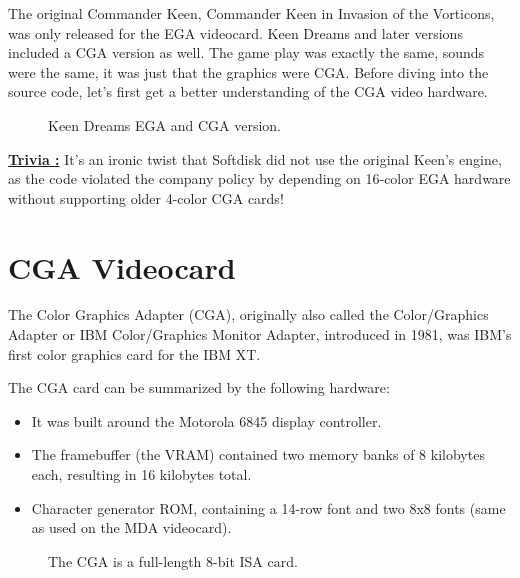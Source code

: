\documentclass[book.tex]{subfiles}
\begin{document}
The original Commander Keen, Commander Keen in Invasion of the Vorticons, was only released for the EGA videocard. Keen Dreams and later versions included a CGA version as well. The game play was exactly the same, sounds were the same, it was just that the graphics were CGA. Before diving into  the source code, let's first get a better understanding of the CGA video hardware.\\


\begin{figure}[H] 
  \centering 
  \caption{Keen Dreams EGA and CGA version.}
\end{figure}

\par
\textbf{\underline{Trivia :}} It's an ironic twist that Softdisk did not use the original Keen's engine, as the code violated the company policy by depending on 16-color EGA hardware without supporting older 4-color CGA cards!\\
\par


 

\section{CGA Videocard}
The Color Graphics Adapter (CGA), originally also called the Color/Graphics Adapter or IBM Color/Graphics Monitor Adapter, introduced in 1981, was IBM's first color graphics card for the IBM XT.\\
\par
The CGA card can be summarized by the following hardware:
\begin{itemize}
  \item It was built around the Motorola 6845 display controller.
  \item The framebuffer (the VRAM) contained two memory banks of 8 kilobytes each, resulting in 16 kilobytes total.
  \item Character generator ROM, containing a 14-row font and two 8x8 fonts (same as used on the MDA videocard).
\end{itemize}

\begin{figure}[H] 
  \centering 
  \caption{The CGA is a full-length 8-bit ISA card.}
\end{figure}
\end{document}

